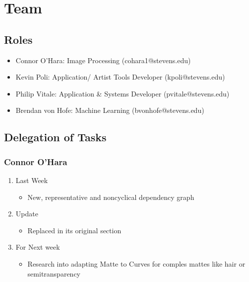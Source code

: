\documentclass[15pt]{article}
\begin{document}
\section{Team}
\label{sec:org3f3ce63}
\subsection{Roles}
\label{sec:org47ffda7}
\begin{itemize}
\item Connor O’Hara: Image Processing (cohara1@stevens.edu)
\item Kevin Poli: Application/ Artist Tools Developer (kpoli@stevens.edu)
\item Philip Vitale: Application \& Systems Developer (pvitale@stevens.edu)
\item Brendan von Hofe: Machine Learning (bvonhofe@stevens.edu)
\end{itemize}



\subsection{Delegation of Tasks}
\label{sec:orgb479d3c}

\subsubsection{Connor O’Hara}
\label{sec:orgcdacdb3}
\begin{enumerate}
\item Last Week
\label{sec:orgaabd651}
\begin{itemize}
\item New, representative and noncyclical dependency graph
\end{itemize}
\item Update
\label{sec:org6e4ffc4}
\begin{itemize}
\item Replaced in its original section
\end{itemize}
\item For Next week
\label{sec:org3b35c22}
\begin{itemize}
\item Research into adapting Matte to Curves for comples mattes like hair or semitransparency
\end{itemize}
\end{enumerate}
\end{document}
